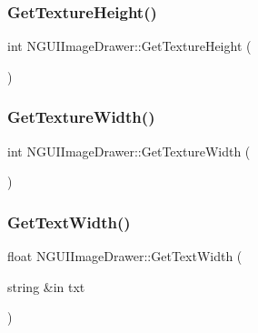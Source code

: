 \hypertarget{class_n_g_u_i_image_drawer_a97433166c43f695a38f6b69b49734970}{}\label{class_n_g_u_i_image_drawer_a97433166c43f695a38f6b69b49734970} 
\subsubsection{\texorpdfstring{Get\+Texture\+Height()}{GetTextureHeight()}}
{\footnotesize\ttfamily int N\+G\+U\+I\+Image\+Drawer\+::\+Get\+Texture\+Height (\begin{DoxyParamCaption}{ }\end{DoxyParamCaption})}

\hypertarget{class_n_g_u_i_image_drawer_aebc034830dd698ca71fdeccc7fd85ff9}{}\label{class_n_g_u_i_image_drawer_aebc034830dd698ca71fdeccc7fd85ff9} 
\subsubsection{\texorpdfstring{Get\+Texture\+Width()}{GetTextureWidth()}}
{\footnotesize\ttfamily int N\+G\+U\+I\+Image\+Drawer\+::\+Get\+Texture\+Width (\begin{DoxyParamCaption}{ }\end{DoxyParamCaption})}

\hypertarget{class_n_g_u_i_image_drawer_ac7ad44de578d1d6c1f07ce66a8039502}{}\label{class_n_g_u_i_image_drawer_ac7ad44de578d1d6c1f07ce66a8039502} 
\subsubsection{\texorpdfstring{Get\+Text\+Width()}{GetTextWidth()}}
{\footnotesize\ttfamily float N\+G\+U\+I\+Image\+Drawer\+::\+Get\+Text\+Width (\begin{DoxyParamCaption}\item[{string \&in}]{txt }\end{DoxyParamCaption})}

\hypertarget{class_n_g_u_i_image_drawer_a0afde960d00a89b2b7c2c622771deb29}{}\label{class_n_g_u_i_image_drawer_a0afde960d00a89b2b7c2c622771deb29} 
